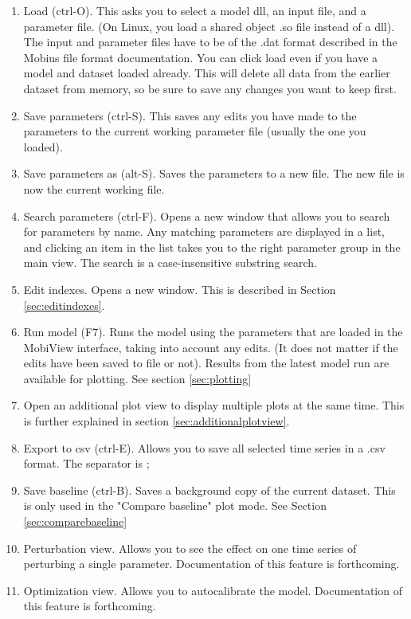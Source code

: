 \documentclass[11pt]{article}
\theoremstyle{definition}
\begin{document}
\begin{enumerate}
\item Load (ctrl-O). This asks you to select a model dll, an input file, and a parameter file. (On Linux, you load a shared object .so file instead of a dll). The input and parameter files have to be of the .dat format described in the Mobius file format documentation. You can click load even if you have a model and dataset loaded already. This will delete all data from the earlier dataset from memory, so be sure to save any changes you want to keep first.
\item Save parameters (ctrl-S). This saves any edits you have made to the parameters to the current working parameter file (usually the one you loaded).
\item Save parameters as (alt-S). Saves the parameters to a new file. The new file is now the current working file.
\item Search parameters (ctrl-F). Opens a new window that allows you to search for parameters by name. Any matching parameters are displayed in a list, and clicking an item in the list takes you to the right parameter group in the main view. The search is a case-insensitive substring search.
\item Edit indexes. Opens a new window. This is described in Section \ref{sec:editindexes}.

\item Run model (F7). Runs the model using the parameters that are loaded in the MobiView interface, taking into account any edits. (It does not matter if the edits have been saved to file or not). Results from the latest model run are available for plotting. See section \ref{sec:plotting}
\item Open an additional plot view to display multiple plots at the same time. This is further explained in section \ref{sec:additionalplotview}.
\item Export to csv (ctrl-E). Allows you to save all selected time series in a .csv format. The separator is ;

\item Save baseline (ctrl-B). Saves a background copy of the current dataset. This is only used in the "Compare baseline" plot mode. See Section \ref{sec:comparebaseline}
\item Perturbation view. Allows you to see the effect on one time series of perturbing a single parameter. Documentation of this feature is forthcoming.
\item Optimization view. Allows you to autocalibrate the model. Documentation of this feature is forthcoming.


\end{enumerate}
\end{document}
